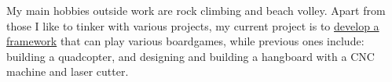 



My main hobbies outside work are rock climbing and beach volley.
Apart from those I like to tinker with various projects, my current project is to {\href{https://github.com/tueboesen/Boardgame_AI}{develop a framework}} that can play various boardgames, while previous ones include: building a quadcopter, and designing and building a hangboard with a CNC machine and laser cutter.


